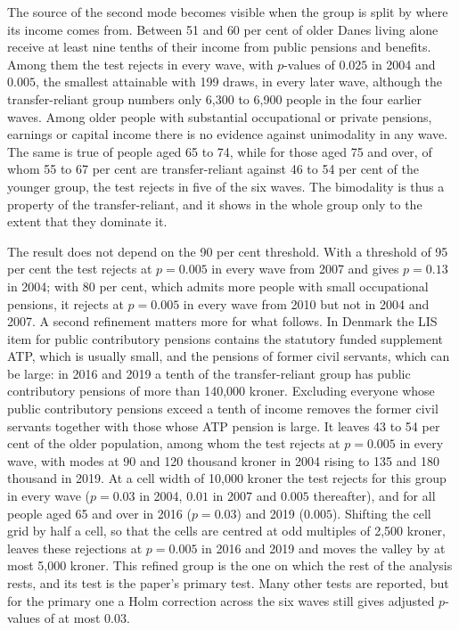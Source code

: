 The source of the second mode becomes visible when the group is split by where its income comes from. Between 51 and 60 per cent of older Danes living alone receive at least nine tenths of their income from public pensions and benefits. Among them the test rejects in every wave, with $p$-values of $0.025$ in 2004 and $0.005$, the smallest attainable with 199 draws, in every later wave, although the transfer-reliant group numbers only 6{,}300 to 6{,}900 people in the four earlier waves. Among older people with substantial occupational or private pensions, earnings or capital income there is no evidence against unimodality in any wave. The same is true of people aged 65 to 74, while for those aged 75 and over, of whom 55 to 67 per cent are transfer-reliant against 46 to 54 per cent of the younger group, the test rejects in five of the six waves. The bimodality is thus a property of the transfer-reliant, and it shows in the whole group only to the extent that they dominate it.

The result does not depend on the 90 per cent threshold. With a threshold of 95 per cent the test rejects at $p=0.005$ in every wave from 2007 and gives $p=0.13$ in 2004; with 80 per cent, which admits more people with small occupational pensions, it rejects at $p=0.005$ in every wave from 2010 but not in 2004 and 2007. A second refinement matters more for what follows. In Denmark the LIS item for public contributory pensions contains the statutory funded supplement ATP, which is usually small, and the pensions of former civil servants, which can be large: in 2016 and 2019 a tenth of the transfer-reliant group has public contributory pensions of more than 140{,}000 kroner. Excluding everyone whose public contributory pensions exceed a tenth of income removes the former civil servants together with those whose ATP pension is large. It leaves 43 to 54 per cent of the older population, among whom the test rejects at $p=0.005$ in every wave, with modes at 90 and 120 thousand kroner in 2004 rising to 135 and 180 thousand in 2019. At a cell width of 10{,}000 kroner the test rejects for this group in every wave ($p=0.03$ in 2004, $0.01$ in 2007 and $0.005$ thereafter), and for all people aged 65 and over in 2016 ($p=0.03$) and 2019 ($0.005$). Shifting the cell grid by half a cell, so that the cells are centred at odd multiples of 2{,}500 kroner, leaves these rejections at $p=0.005$ in 2016 and 2019 and moves the valley by at most 5{,}000 kroner. This refined group is the one on which the rest of the analysis rests, and its test is the paper's primary test. Many other tests are reported, but for the primary one a Holm correction across the six waves still gives adjusted $p$-values of at most $0.03$.


